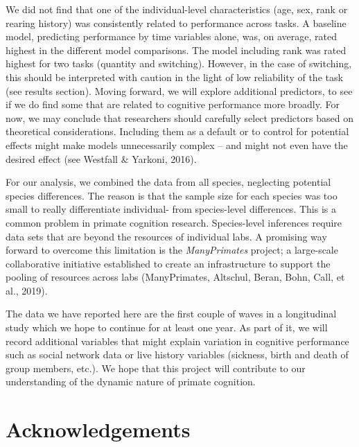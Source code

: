 \documentclass[10pt, letterpaper]{article}
\begin{document}
We did not find that one of the individual-level characteristics (age,
sex, rank or rearing history) was consistently related to performance
across tasks. A baseline model, predicting performance by time variables
alone, was, on average, rated highest in the different model
comparisons. The model including rank was rated highest for two tasks
(quantity and switching). However, in the case of switching, this should
be interpreted with caution in the light of low reliability of the task
(see results section). Moving forward, we will explore additional
predictors, to see if we do find some that are related to cognitive
performance more broadly. For now, we may conclude that researchers
should carefully select predictors based on theoretical considerations.
Including them as a default or to control for potential effects might
make models unnecessarily complex -- and might not even have the desired
effect (see Westfall \& Yarkoni, 2016).

For our analysis, we combined the data from all species, neglecting
potential species differences. The reason is that the sample size for
each species was too small to really differentiate individual- from
species-level differences. This is a common problem in primate cognition
research. Species-level inferences require data sets that are beyond the
resources of individual labs. A promising way forward to overcome this
limitation is the \emph{ManyPrimates} project; a large-scale
collaborative initiative established to create an infrastructure to
support the pooling of resources across labs (ManyPrimates, Altschul,
Beran, Bohn, Call, et al., 2019).

The data we have reported here are the first couple of waves in a
longitudinal study which we hope to continue for at least one year. As
part of it, we will record additional variables that might explain
variation in cognitive performance such as social network data or live
history variables (sickness, birth and death of group members, etc.). We
hope that this project will contribute to our understanding of the
dynamic nature of primate cognition.

\vspace{1em}

\vspace{1em}

\hypertarget{acknowledgements}{%
\section{Acknowledgements}\label{acknowledgements}}
\end{document}
